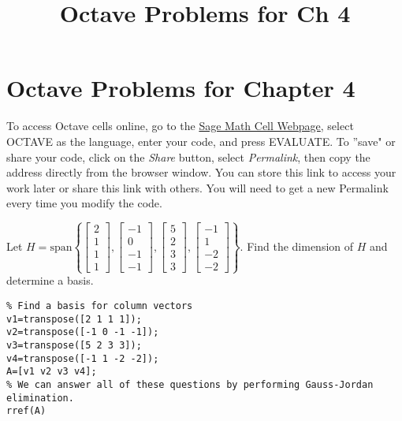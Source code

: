 \documentclass{ximera}
\title{Octave Problems for Ch 4} \license{CC BY-NC-SA 4.0}
\begin{document}
\begin{abstract}
\end{abstract}
\maketitle

\section*{Octave Problems for Chapter 4}

To access Octave cells online, go to the \href{https://sagecell.sagemath.org/}{Sage Math Cell Webpage}, select OCTAVE as the language, enter your code, and press EVALUATE.  
To ''save" or share your code, click on the \emph{Share} button, select \emph{Permalink}, then copy the address directly from the browser window.  You can store this link to access your work later or share this link with others.  You will need to get a new Permalink every time you modify the code.


\begin{problem}\label{prb:5.1} Let $H = \mbox{span}\left\{ \left[
\begin{array}{r}
2 \\
1 \\
1 \\
1
\end{array}
\right] ,\left[
\begin{array}{r}
-1 \\
0 \\
-1 \\
-1
\end{array}
\right] ,\left[
\begin{array}{r}
5 \\
2 \\
3 \\
3
\end{array}
\right] ,\left[
\begin{array}{r}
-1 \\
1 \\
-2 \\
-2
\end{array}
\right] \right\} .$ Find the dimension of $H$ and determine a basis.

\begin{hint}
    \begin{verbatim}
% Find a basis for column vectors
v1=transpose([2 1 1 1]);
v2=transpose([-1 0 -1 -1]);
v3=transpose([5 2 3 3]);
v4=transpose([-1 1 -2 -2]);
A=[v1 v2 v3 v4];
% We can answer all of these questions by performing Gauss-Jordan elimination.
rref(A)
\end{verbatim}
\end{hint}
\end{problem}
\end{document}
